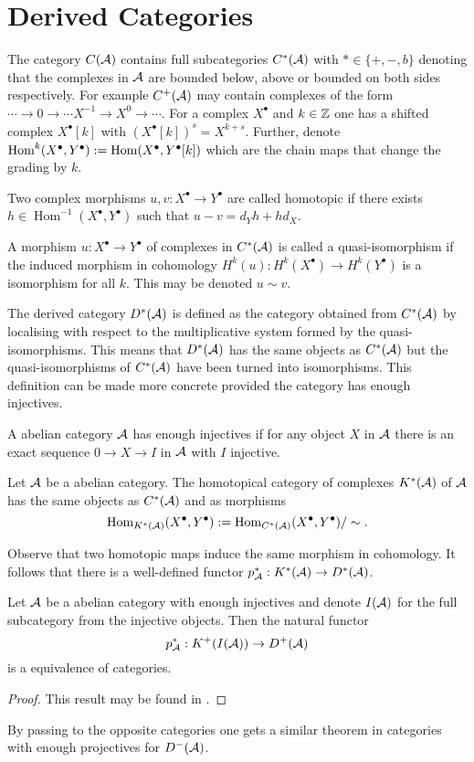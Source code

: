 \section{Derived Categories}
The category $C(\AA)$ contains full subcategories $C^*(\AA)$ with $*\in \{ +, -, b\}$ denoting that the complexes in $\AA$ are bounded below, above or bounded on both sides respectively.
For example $C^+(\AA)$ may contain complexes of the form $\cdots \to 0\to \cdots X^{-1} \to X^0 \to \cdots$.
For a complex $X^\bullet$ and $k\in \Z$ one has a shifted complex $X^\bullet[k]$ with $(X^\bullet[k])^s = X^{k+s}$.
Further, denote $\operatorname{Hom}^k(X^\bullet, Y^\bullet) :=  \op{Hom}(X^\bullet, Y^\bullet[k])$ which are the chain maps that change the grading by $k$.
\begin{definition}
 Two complex morphisms $u,v:X^\bullet\to Y^\bullet$ are called homotopic if there exists $h\in \operatorname{Hom}^{-1}(X^\bullet, Y^\bullet)$ such that $u-v = d_Y h + hd_X$.
\end{definition}
\begin{definition}
 A morphism $u:X^\bullet\to Y^\bullet$  of complexes in $C^*(\AA)$ is called a quasi-isomorphism if the induced morphism in cohomology $H^k(u):H^k(X^\bullet) \to H^k(Y^\bullet)$ is a isomorphism for all $k$. This may be denoted $u\sim v$.
\end{definition}
The derived category $D^*(\AA)$ is defined as the category obtained from $C^*(\AA)$ by localising with respect to the multiplicative system formed by the quasi-isomorphisms.
This means that $D^*(\AA)$ has the same objects as $C^*(\AA)$ but the quasi-isomorphisms of $C^*(\AA)$ have been turned into isomorphisms.
This definition can be made more concrete provided the category has enough injectives.
\begin{definition}
 A abelian category $\AA$ has enough injectives if for any object $X$ in $\AA$ there is an exact sequence $0\to X \to I$ in $\AA$ with $I$ injective.
\end{definition}
\begin{definition}
 Let $\AA$ be a abelian category.
 The homotopical category of complexes $K^*(\AA)$ of $\AA$ has the same objects as $C^*(\AA)$ and as morphisms
 $$\operatorname{Hom}_{K^*(\AA)}(X^\bullet,Y^\bullet):= \operatorname{Hom}_{C^*(\AA)}(X^\bullet,Y^\bullet)/\sim.$$
\end{definition}
Observe that two homotopic maps induce the same morphism in cohomology.
It follows that there is a well-defined functor $p_\AA^*:K^*(\AA)\to D^*(\AA)$.
\begin{proposition}\label{prop: DerivedCategoryInjectives}
 Let $\AA$ be a abelian category with enough injectives and denote $I(\AA)$ for the full subcategory from the injective objects.
 Then the natural functor
 $$p_\AA^*: K^+(I(\AA))\to D^+(\AA) $$
 is a equivalence of categories.
\end{proposition}
\begin{proof}
  This result may be found in \cite[Chapter 1]{dimca2004sheaves}.
\end{proof}
By passing to the opposite categories one gets a similar theorem in categories with enough projectives for $D^-(\AA)$.
